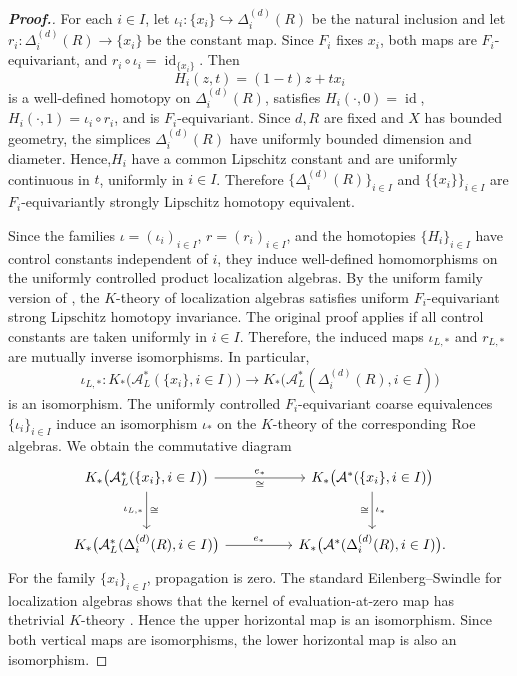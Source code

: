 \documentclass[pdflatex]{sn-jnl}
\theoremstyle{plain}
\theoremstyle{definition}
\begin{document}
\begin{proof}[\textbf{Proof.}]\normalsize
For each $i\in I$, let
$\iota_i:\{x_i\}\hookrightarrow\Delta_i^{(d)}(R)$
be the natural inclusion and let
$r_i:\Delta_i^{(d)}(R)\to\{x_i\}$
be the constant map. Since $F_i$ fixes $x_i$, both maps are $F_i$-equivariant, and
$r_i\circ\iota_i=\operatorname{id}_{\{x_i\}}$.
Then
$$H_i(z,t)=(1-t)z+t x_i$$
is a well-defined homotopy on $\Delta_i^{(d)}(R)$, satisfies
$H_i(\cdot,0)=\operatorname{id}$,
$H_i(\cdot,1)=\iota_i\circ r_i$,
and is $F_i$-equivariant. Since $d, R$ are fixed and $X$ has bounded geometry, the simplices $\Delta_i^{(d)}(R)$ have uniformly bounded dimension and diameter. Hence,$H_i$ have a common Lipschitz constant and are uniformly
continuous in $t$, uniformly in $i\in I$. Therefore
$\{\Delta_i^{(d)}(R)\}_{i\in I}$ and $\{\{x_i\}\}_{i\in I}$ are
$F_i$-equivariantly strongly Lipschitz homotopy equivalent.

Since the families
$\iota=(\iota_i)_{i\in I}$,
$r=(r_i)_{i\in I}$,
and the homotopies $\{H_i\}_{i\in I}$ have control constants
independent of $i$, they induce well-defined homomorphisms on the
uniformly controlled product localization algebras.
By the uniform family version of \cite[Theorem 3.2]{Yu97}, the $K$-theory of localization algebras satisfies uniform $F_i$-equivariant strong Lipschitz homotopy invariance. The original proof applies if all control constants are taken uniformly in $i\in I$. Therefore, the induced maps $\iota_{L,*}$ and $r_{L,*}$ are mutually inverse isomorphisms. In particular,
\[\iota_{L,*} \colon
K_{*}\bigl(\mathcal{A}_L^*(\{x_i\},i\in I)\bigr)
\longrightarrow
K_{*}\bigl(\mathcal{A}_L^*(\Delta_i^{(d)}(R),i\in I)\bigr)\]
is an isomorphism.
The uniformly controlled $F_i$-equivariant coarse equivalences
$\{\iota_i\}_{i\in I}$ induce an isomorphism $\iota_{*}$ on the
$K$-theory of the corresponding Roe algebras. We obtain
the commutative diagram
\[
\begin{tikzcd}[row sep=large, column sep=huge]
K_{*}\bigl(\mathcal{A}_L^{*}(\{x_i\},i\in I)\bigr)
    \arrow[r,"e_{*}", "\cong"'] \arrow[d,"\iota_{L,*}"', "\cong"]
&
K_{*}\bigl(\mathcal{A}^{*}(\{x_i\},i\in I)\bigr)
    \arrow[d,"\iota_{*}", "\cong"']
\\
K_{*}\bigl(\mathcal{A}_L^{*}(\Delta_i^{(d)}(R),i\in I)\bigr)
    \arrow[r,"e_{*}"]
&
K_{*}\bigl(\mathcal{A}^{*}(\Delta_i^{(d)}(R),i\in I)\bigr).
\end{tikzcd}
\]
For the family $\{x_i\}_{i\in I}$, propagation is
zero. The standard Eilenberg--Swindle for localization
algebras shows that the kernel of evaluation-at-zero map has thetrivial
$K$-theory \cite{WY2020}. Hence the upper horizontal map is an isomorphism.
Since both vertical maps are isomorphisms, the lower horizontal
map is also an isomorphism. 
\end{proof}
\end{document}
